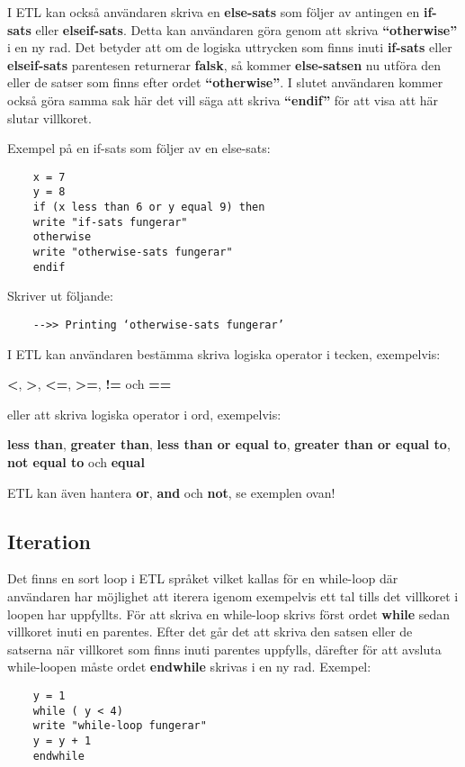 \documentclass{TDP019mall}
\begin{document}
I ETL kan också användaren skriva en \textbf{else-sats} som följer av antingen en \textbf{if-sats} eller \textbf{elseif-sats}. 
Detta kan användaren göra genom att skriva \textbf{“otherwise”} i 
en ny rad. Det betyder att om de logiska uttrycken som finns inuti \textbf{if-sats} eller \textbf{elseif-sats} parentesen returnerar \textbf{falsk}, 
så kommer \textbf{else-satsen} nu utföra den eller 
de satser som finns efter ordet \textbf{“otherwise”}. I slutet användaren kommer också göra samma sak här det vill säga att skriva \textbf{“endif”} 
för att visa att här slutar villkoret.

Exempel på en if-sats som följer av en else-sats: 
\begin{verbatim}
    x = 7
    y = 8
    if (x less than 6 or y equal 9) then
    write "if-sats fungerar"
    otherwise
    write "otherwise-sats fungerar"
    endif
\end{verbatim} 

Skriver ut följande:
\begin{verbatim}
    -->> Printing ‘otherwise-sats fungerar’
\end{verbatim}

I ETL kan användaren bestämma skriva logiska operator i tecken, exempelvis: 

\textbf{<}, \textbf{>}, \textbf{<=}, \textbf{>=}, \textbf{!=} och \textbf{==} 

eller att skriva logiska operator i ord, exempelvis:

\textbf{less than}, \textbf{greater than}, \textbf{less than or equal to}, \textbf{greater than or equal to}, \textbf{not equal to} och \textbf{equal} 
\break 

ETL kan även hantera \textbf{or}, \textbf{and} och \textbf{not}, se exemplen ovan!

\newpage
\subsection{Iteration}
Det finns en sort loop i ETL språket vilket kallas för en while-loop där användaren har möjlighet att iterera igenom exempelvis ett tal tills det villkoret i loopen har uppfyllts. 
För att skriva en while-loop skrivs först ordet \textbf{while} sedan villkoret inuti en parentes. Efter det går det att skriva den satsen eller de satserna när villkoret som finns inuti parentes uppfylls, därefter för att avsluta while-loopen måste ordet \textbf{endwhile} skrivas i en ny rad. 
Exempel: 
\begin{verbatim}
    y = 1
    while ( y < 4)
    write "while-loop fungerar"
    y = y + 1
    endwhile
\end{verbatim}
 
\end{document}
